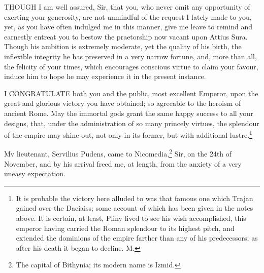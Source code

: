 
THOUGH I am well assured, Sir, that you, who never omit any opportunity of
exerting your generosity, are not unmindful of the request I lately made
to you, yet, as you have often indulged me in this manner, give me leave
to remind and earnestly entreat you to bestow the praetorship now vacant
upon Attius Sura. Though his ambition is extremely moderate, yet the
quality of his birth, the inflexible integrity he has preserved in a very
narrow fortune, and, more than all, the felicity of your times, which
encourages conscious virtue to claim your favour, induce him to hope he
may experience it in the present instance.


I CONGRATULATE both you and the public, most excellent Emperor, upon the
great and glorious victory you have obtained; so agreeable to the heroism
of ancient Rome. May the immortal gods grant the same happy success to all
your designs, that, under the administration of so many princely virtues,
the splendour of the empire may shine out, not only in its former, but
with additional lustre.\footnote{It is probable the
victory here alluded to was that famous one which Trajan gained over the
Daciaiss; some account of which has been given in the notes above. It is
certain, at least, Pliny lived to see his wish accomplished, this emperor
having carried the Roman splendour to its highest pitch, and extended the
dominions of the empire farther than any of his predecessors; as after his
death it began to decline. M.}


Mv lieutenant, Servilius Pudens, came to Nicomedia,\footnote{The capital of
Bithynia; its modern name is Izmid.} Sir, on the 24th
of November, and by his arrival freed me, at length, from the anxiety of a
very uneasy expectation.



